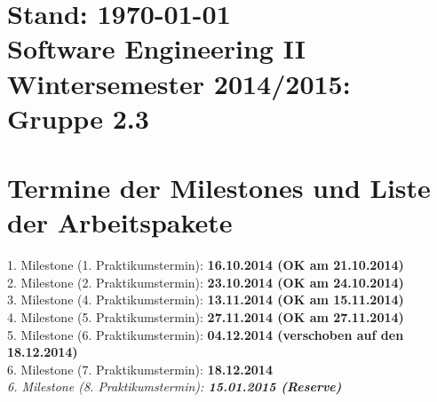 \documentclass[a4paper,10pt]{article}
\begin{document}
  \section*{\small{\flushright Stand: \today\\ \flushleft Software Engineering II \\ Wintersemester 2014/2015: Gruppe 2.3}}
  \section*{Termine der Milestones und Liste der Arbeitspakete}
  1. Milestone (1. Praktikumstermin): \textbf{16.10.2014 \textbar \space (OK am 21.10.2014)}\\
  2. Milestone (2. Praktikumstermin): \textbf{23.10.2014 \textbar \space (OK am 24.10.2014)}\\
  3. Milestone (4. Praktikumstermin): \textbf{13.11.2014 \textbar \space (OK am 15.11.2014)}\\
  4. Milestone (5. Praktikumstermin): \textbf{27.11.2014 \textbar \space (OK am 27.11.2014)}\\
  5. Milestone (6. Praktikumstermin): \textbf{04.12.2014 \textbar \space (verschoben auf den 18.12.2014)}\\
  6. Milestone (7. Praktikumstermin): \textbf{18.12.2014}\\
  \textit{6. Milestone (8. Praktikumstermin): \textbf{15.01.2015 (Reserve)}}\\
\end{document}
